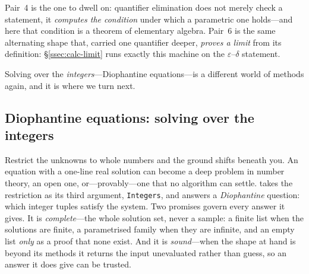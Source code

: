 Pair~4 is the one to dwell on: quantifier elimination does not merely check a statement,
it \emph{computes the condition} under which a parametric one holds---and here that
condition is a theorem of elementary algebra. Pair~6 is the same alternating shape that,
carried one quantifier deeper, \emph{proves a limit} from its definition:
\S\ref{ssec:calc-limit} runs exactly this machine on the \(\varepsilon\)--\(\delta\)
statement.


Solving over the \emph{integers}---Diophantine equations---is a different world of methods
again, and it is where we turn next.

\subsection{Diophantine equations: solving over the integers}
\label{ssec:alg-diophantine}

Restrict the unknowns to whole numbers and the ground shifts beneath you. An equation
with a one-line real solution can become a deep problem in number theory, an open one,
or---provably---one that no algorithm can settle.  takes the restriction as its
third argument, \texttt{Integers}, and answers a \emph{Diophantine} question: which integer tuples satisfy the system. Two promises govern every
answer it gives. It is \emph{complete}---the whole solution set, never a sample: a finite
list when the solutions are finite, a parametrised family when they are infinite, and an
empty list \emph{only} as a proof that none exist. And it is \emph{sound}---when the shape
at hand is beyond its methods it returns the input unevaluated rather than guess, so an
answer it does give can be trusted.

